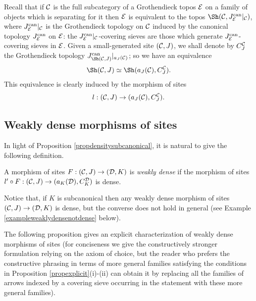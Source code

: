 \documentclass[a4paper,12pt]{article}
\begin{document}
Recall that if $\cal C$ is the full subcategory of a Grothendieck topos $\cal E$ on a family of objects which is separating for it then $\cal E$ is equivalent to the topos $\Sh({\cal C}, J^{\textup{can}}_{\cal E}|_{\cal C})$, where $J^{\textup{can}}_{\cal E}|_{\cal C}$ is the Grothendieck topology on $\cal C$ induced by the canonical topology $J^{\textup{can}}_{\cal E}$ on $\cal E$: the $J^{\textup{can}}_{\cal E}|_{\cal C}$-covering sieves are those which generate $J^{\textup{can}}_{\cal E}$-covering sieves in $\cal E$. Given a small-generated site $({\cal C}, J)$, we shall denote by $C_{J}^{\cal C}$ the Grothendieck topology $J^{\textup{can}}_{\Sh({\cal C}, J)}|_{a_{J}({\cal C})}$; so we have an equivalence
\[
\Sh({\cal C}, J)\simeq \Sh(a_{J}({\cal C}), C_{J}^{\cal C}).
\] 
This equivalence is clearly induced by the morphism of sites 
\[
l:({\cal C}, J)\to (a_{J}({\cal C}), C_{J}^{\cal C}).
\]

\subsection{Weakly dense morphisms of sites}

In light of Proposition \ref{propdensitysubcanonical}, it is natural to give the following definition.

\begin{definition}\label{defweaklydensemorphism}
	A morphism of sites $F:({\cal C}, J)\to ({\cal D}, K)$ is \emph{weakly dense} if the morphism of sites $l'\circ F:({\cal C}, J)\to (a_{K}({\cal D}), C_{K}^{\cal D})$ is dense.
\end{definition}

Notice that, if $K$ is subcanonical then any weakly dense morphism of sites
$({\cal C}, J)\to ({\cal D}, K)$ is dense, but the converse does not hold in general (see Example \ref{exampleweaklydensenotdense} below).

The following proposition gives an explicit characterization of weakly dense morphisms of sites (for conciseness we give the constructively stronger formulation relying on the axiom of choice, but the reader who prefers the constructive phrasing in terms of more general families satisfying the conditions in Proposition \ref{propexplicit}(i)-(ii) can obtain it by replacing all the families of arrows indexed by a covering sieve occurring in the statement with these more general families).
 
\end{document}

